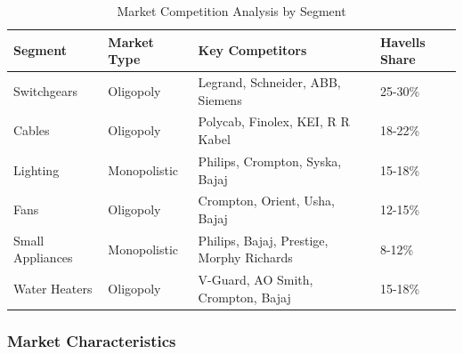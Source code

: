 \documentclass[12pt,a4paper]{article}
\begin{document}
\begin{table}[H]
    \centering
    \caption{Market Competition Analysis by Segment}
    \begin{tabularx}{\textwidth}{|l|l|X|l|}
        \hline
        \textbf{Segment} & \textbf{Market Type} & \textbf{Key Competitors} & \textbf{Havells Share} \\
        \hline
        Switchgears & Oligopoly & Legrand, Schneider, ABB, Siemens & 25-30\% \\
        \hline
        Cables & Oligopoly & Polycab, Finolex, KEI, R R Kabel & 18-22\% \\
        \hline
        Lighting & Monopolistic & Philips, Crompton, Syska, Bajaj & 15-18\% \\
        \hline
        Fans & Oligopoly & Crompton, Orient, Usha, Bajaj & 12-15\% \\
        \hline
        Small Appliances & Monopolistic & Philips, Bajaj, Prestige, Morphy Richards & 8-12\% \\
        \hline
        Water Heaters & Oligopoly & V-Guard, AO Smith, Crompton, Bajaj & 15-18\% \\
        \hline
    \end{tabularx}
\end{table}

\subsubsection{Market Characteristics}
\end{document}
